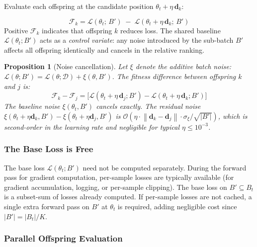 \documentclass[12pt]{article}
\newcommand{\eqbox}[2]{%
  \begin{tcolorbox}[eqstyle, title={#1}]
    #2
  \end{tcolorbox}
}
\newtheorem{proposition}{Proposition}
\newcommand{\norm}[1]{\left\lVert#1\right\rVert}
\newcommand{\Loss}{\mathcal{L}}
\begin{document}
Evaluate each offspring at the candidate position
$\theta_t + \eta\,\mathbf{d}_k$:

\eqbox{Definition 2 \textemdash\ Probe Fitness}{
\begin{equation}
  \mathcal{F}_k = \Loss(\theta_t;\, B')
    \;-\; \Loss(\theta_t + \eta\,\mathbf{d}_k;\, B')
  \label{eq:fitness}
\end{equation}
\smallskip
Positive $\mathcal{F}_k$ indicates that offspring $k$ reduces loss.
The shared baseline $\Loss(\theta_t; B')$ acts as a \emph{control variate}:
any noise introduced by the sub-batch $B'$ affects all offspring
identically and cancels in the relative ranking.
}

\begin{proposition}[Noise cancellation]
\label{prop:noise}
Let $\xi$ denote the additive batch noise:
$\Loss(\theta; B') = \Loss(\theta; \mathcal{D}) + \xi(\theta, B')$.
The fitness difference between offspring $k$ and $j$ is:
\begin{equation*}
  \mathcal{F}_k - \mathcal{F}_j
  = \bigl[\Loss(\theta_t + \eta\,\mathbf{d}_j; B')
    - \Loss(\theta_t + \eta\,\mathbf{d}_k; B')\bigr]
\end{equation*}
The baseline noise $\xi(\theta_t, B')$ cancels exactly.
The residual noise $\xi(\theta_t + \eta\mathbf{d}_k, B')
- \xi(\theta_t + \eta\mathbf{d}_j, B')$ is
$\mathcal{O}(\eta \cdot \norm{\mathbf{d}_k - \mathbf{d}_j} \cdot
\sigma_\xi / \sqrt{|B'|})$, which is second-order in the learning rate
and negligible for typical $\eta \leq 10^{-3}$.
\end{proposition}

\subsubsection{The Base Loss is Free}

The base loss $\Loss(\theta_t; B')$ need not be computed separately.
During the forward pass for gradient computation, per-sample losses
are typically available (for gradient accumulation, logging, or
per-sample clipping).
The base loss on $B' \subseteq B_t$ is a subset-sum of losses already
computed.
If per-sample losses are not cached, a single extra forward pass on $B'$
at $\theta_t$ is required, adding negligible cost since $|B'| = |B_t|/K$.

\subsubsection{Parallel Offspring Evaluation}
\end{document}
